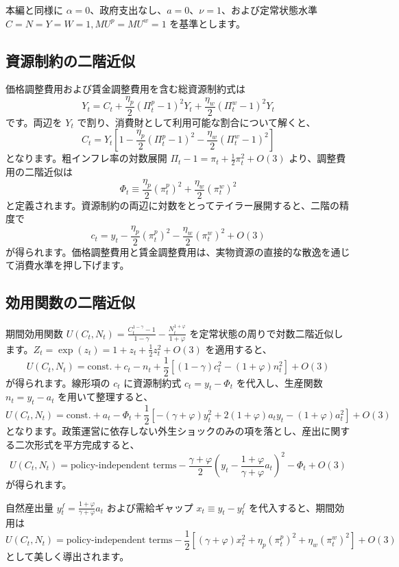 \documentclass[
  japanese,
  lualatex,
  ja=standard,
  12pt,
  a4paper]{ltjsarticle}
\begin{document}
本編と同様に
\(\alpha=0\)、政府支出なし、\(a=0\)、\(\nu=1\)、および定常状態水準
\(C=N=Y=W=1, MU^p=MU^w=1\) を基準とします。

\subsection{資源制約の二階近似}\label{ux8cc7ux6e90ux5236ux7d04ux306eux4e8cux968eux8fd1ux4f3c}

価格調整費用および賃金調整費用を含む総資源制約式は \[
Y_t
=
C_t
+
\frac{\eta_p}{2}(\Pi_t^p-1)^2Y_t
+
\frac{\eta_w}{2}(\Pi_t^w-1)^2Y_t
\] です。両辺を \(Y_t\)
で割り、消費財として利用可能な割合について解くと、 \[
C_t
=
Y_t
\left[
1
-
\frac{\eta_p}{2}(\Pi_t^p-1)^2
-
\frac{\eta_w}{2}(\Pi_t^w-1)^2
\right]
\] となります。粗インフレ率の対数展開
\(\Pi_t-1 = \pi_t + \frac{1}{2}\pi_t^2 + O(3)\)
より、調整費用の二階近似は \[
\Phi_t
\equiv
\frac{\eta_p}{2}(\pi_t^p)^2
+
\frac{\eta_w}{2}(\pi_t^w)^2
\]
と定義されます。資源制約の両辺に対数をとってテイラー展開すると、二階の精度で
\[
c_t
=
y_t
-
\frac{\eta_p}{2}(\pi_t^p)^2
-
\frac{\eta_w}{2}(\pi_t^w)^2
+O(3)
\]
が得られます。価格調整費用と賃金調整費用は、実物資源の直接的な散逸を通じて消費水準を押し下げます。

\Needspace{0.28\textheight}

\subsection{効用関数の二階近似}\label{ux52b9ux7528ux95a2ux6570ux306eux4e8cux968eux8fd1ux4f3c}

期間効用関数
\(U(C_t, N_t) = \frac{C_t^{1-\gamma}-1}{1-\gamma} - \frac{N_t^{1+\varphi}}{1+\varphi}\)
を定常状態の周りで対数二階近似します。\(Z_t = \exp(z_t) = 1 + z_t + \frac{1}{2}z_t^2 + O(3)\)
を適用すると、 \[
U(C_t,N_t)
=
\text{const.}
+
c_t-n_t
+
\frac{1}{2}
\left[
(1-\gamma)c_t^2
-
(1+\varphi)n_t^2
\right]
+O(3)
\] が得られます。線形項の \(c_t\) に資源制約式 \(c_t = y_t - \Phi_t\)
を代入し、生産関数 \(n_t = y_t - a_t\) を用いて整理すると、 \[
U(C_t,N_t)
=
\text{const.}
+a_t
-\Phi_t
+
\frac{1}{2}
\left[
-(\gamma+\varphi)y_t^2
+2(1+\varphi)a_t y_t
-(1+\varphi)a_t^2
\right]
+O(3)
\]
となります。政策運営に依存しない外生ショックのみの項を落とし、産出に関する二次形式を平方完成すると、
\[
U(C_t,N_t)
=
\text{policy-independent terms}
-
\frac{\gamma+\varphi}{2}
\left(
y_t-\frac{1+\varphi}{\gamma+\varphi}a_t
\right)^2
-
\Phi_t
+O(3)
\] が得られます。

自然産出量 \(y_t^f = \frac{1+\varphi}{\gamma+\varphi}a_t\)
および需給ギャップ \(x_t \equiv y_t - y_t^f\) を代入すると、期間効用は
\[
U(C_t,N_t)
=
\text{policy-independent terms}
-
\frac{1}{2}
\left[
(\gamma+\varphi)x_t^2
+
\eta_p(\pi_t^p)^2
+
\eta_w(\pi_t^w)^2
\right]
+O(3)
\] として美しく導出されます。
\end{document}
